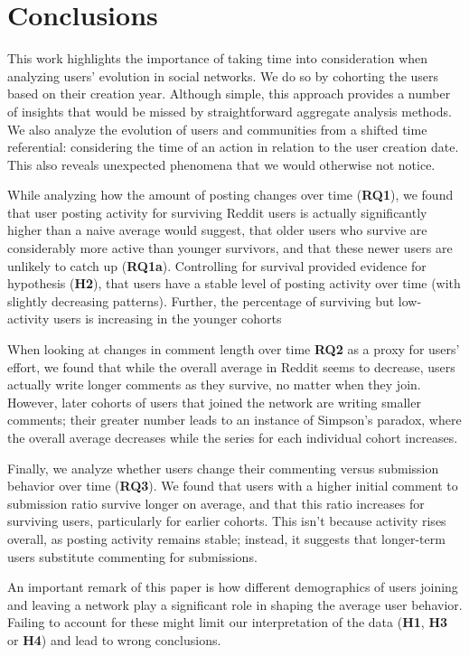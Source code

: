 \documentclass[10pt, oneside, onecolumn]{article}
\begin{document}
\section{Conclusions}

This work highlights the importance of taking time into consideration when analyzing users' evolution in social networks. We do so by cohorting the users based on their creation year. Although simple, this approach provides a number of insights that would be missed by straightforward aggregate analysis methods.  We also analyze the evolution of users and communities from a shifted time referential: considering the time of an action in relation to the user creation date. This also reveals unexpected phenomena that we would otherwise not notice.

While analyzing how the amount of posting changes over time (\textbf{RQ1}), we found that user posting activity for surviving Reddit users is actually significantly higher than a naive average would suggest, that older users who survive are considerably more active than younger survivors, and that these newer users are unlikely to catch up (\textbf{RQ1a}).  Controlling for survival provided evidence for hypothesis (\textbf{H2}), that users have a stable level of posting activity over time (with slightly decreasing patterns).  Further, the percentage of surviving but low-activity users is increasing in the younger cohorts 

When looking at changes in comment length over time \textbf{RQ2} as a proxy for users' effort, we found that while the overall average in Reddit seems to decrease, users actually write longer comments as they survive, no matter when they join.  However, later cohorts of users that joined the network are writing smaller comments; their greater number leads to an instance of Simpson's paradox, where the overall average decreases while the series for each individual cohort increases. 

Finally, we analyze whether users change their commenting versus submission behavior over time (\textbf{RQ3}). 
We found that users with a higher initial comment to submission ratio survive longer on average, and that this ratio increases for surviving users, particularly for earlier cohorts.  This isn't because activity rises overall, as posting activity remains stable; instead, it suggests that longer-term users substitute commenting for submissions. 

An important remark of this paper is how different demographics of users joining and leaving a network play a significant role in shaping the average user behavior. Failing to account for these might limit our interpretation of the data (\textbf{H1}, \textbf{H3} or \textbf{H4}) and lead to wrong conclusions.
\end{document}
